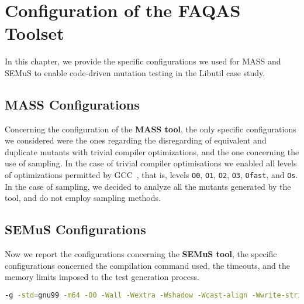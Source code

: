 
\chapter{Configuration of the FAQAS Toolset}

In this chapter, we provide the specific configurations we used for MASS and SEMuS to enable code-driven mutation testing in the Libutil case study.

\section{MASS Configurations}

Concerning the configuration of the \textbf{MASS tool}, the only specific configurations we considered were the ones regarding the disregarding of equivalent and duplicate mutants with trivial compiler optimizations, and the one concerning the use of sampling.
In the case of trivial compiler optimisations we enabled all levels of optimizations permitted by GCC~\cite{GCCopt}, that is, levels \texttt{O0}, \texttt{O1}, \texttt{O2}, \texttt{O3}, \texttt{Ofast}, and \texttt{Os}. 
In the case of sampling, we decided to analyze all the mutants generated by the tool, and do not employ sampling methods. 

\section{SEMuS Configurations}

Now we report the configurations concerning the \textbf{SEMuS tool}, the specific configurations concerned the compilation command used, the timeouts, and the memory limits imposed to the test generation process.

\begin{lstlisting}[language=bash, label=libutil_com_cmd, caption=Compilation command for a single Libutil source used in SEMuS.]
-g -std=gnu99 -m64 -O0 -Wall -Wextra -Wshadow -Wcast-align -Wwrite-strings -Wno-unused-parameter -I$repo_root_dir/src -I$repo_root_dir/src/gosh -I$repo_root_dir/src/zip -I$repo_root_dir/src/watchdog  -I$repo_root_dir/build/src/watchdog -I$repo_root_dir/build/src -I$repo_root_dir/include -I$repo_root_dir/build/include -I$repo_root_dir/include/gs -I$repo_root_dir/build/include/gs -I$repo_root_dir/include/deprecated -I$repo_root_dir/build/include/deprecated -I$repo_root_dir/include/deprecated/gs/gosh -I$repo_root_dir/build/include/deprecated/gs/gosh -I$repo_root_dir/include -o $out_file $in_file
\end{lstlisting}

